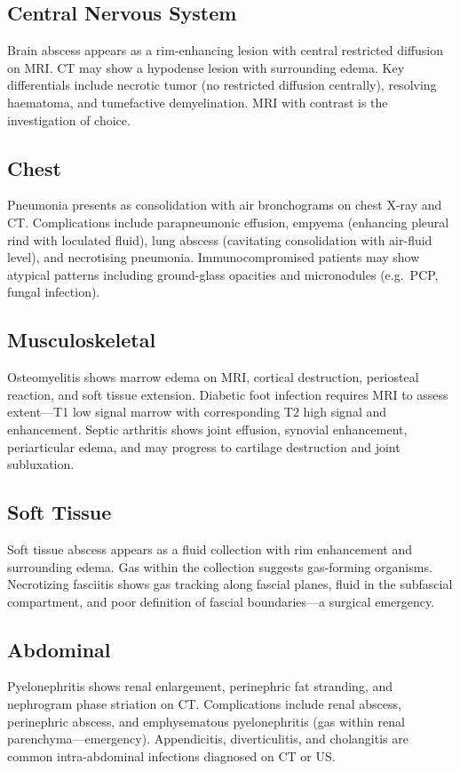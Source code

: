\subsection{Central Nervous System}
Brain abscess appears as a rim-enhancing lesion with central restricted diffusion on MRI. CT may show a hypodense lesion with surrounding edema. Key differentials include necrotic tumor (no restricted diffusion centrally), resolving haematoma, and tumefactive demyelination. MRI with contrast is the investigation of choice.

\subsection{Chest}
Pneumonia presents as consolidation with air bronchograms on chest X-ray and CT. Complications include parapneumonic effusion, empyema (enhancing pleural rind with loculated fluid), lung abscess (cavitating consolidation with air-fluid level), and necrotising pneumonia. Immunocompromised patients may show atypical patterns including ground-glass opacities and micronodules (e.g.\ PCP, fungal infection).

\subsection{Musculoskeletal}
Osteomyelitis shows marrow edema on MRI, cortical destruction, periosteal reaction, and soft tissue extension. Diabetic foot infection requires MRI to assess extent---T1 low signal marrow with corresponding T2 high signal and enhancement. Septic arthritis shows joint effusion, synovial enhancement, periarticular edema, and may progress to cartilage destruction and joint subluxation.

\subsection{Soft Tissue}
Soft tissue abscess appears as a fluid collection with rim enhancement and surrounding edema. Gas within the collection suggests gas-forming organisms. Necrotizing fasciitis shows gas tracking along fascial planes, fluid in the subfascial compartment, and poor definition of fascial boundaries---a surgical emergency.

\subsection{Abdominal}
Pyelonephritis shows renal enlargement, perinephric fat stranding, and nephrogram phase striation on CT. Complications include renal abscess, perinephric abscess, and emphysematous pyelonephritis (gas within renal parenchyma---emergency). Appendicitis, diverticulitis, and cholangitis are common intra-abdominal infections diagnosed on CT or US.


